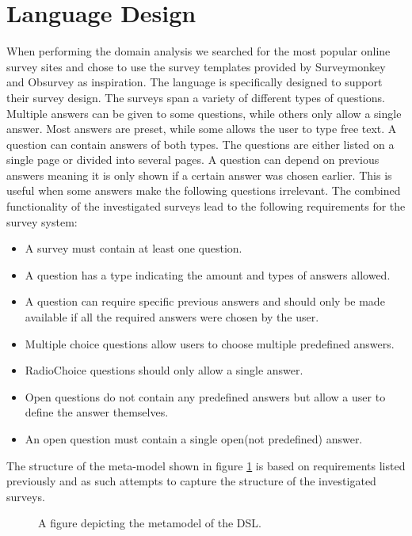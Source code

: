 \documentclass[runningheads]{llncs}
\begin{document}
\section{Language Design}
When performing the domain analysis we searched for the most popular online survey sites and chose to use the survey templates provided by Surveymonkey\cite{surveymonkey} and Obsurvey\cite{obsurvey} as inspiration. The language is specifically designed to support their survey design. The surveys span a variety of different types of questions. Multiple answers can be given to some questions, while others only allow a single answer. Most answers are preset, while some allows the user to type free text. A question can contain answers of both types. The questions are either listed on a single page or divided into several pages. A question can depend on previous answers meaning it is only shown if a certain answer was chosen earlier. This is useful when some answers make the following questions irrelevant. The combined functionality of the investigated surveys lead to the following requirements for the survey system:
\begin{itemize}
\item  A survey must contain at least one question. 
\item A question has a type indicating the amount and types of answers allowed. 
\item A question can require specific previous answers and should only be made available if all the required answers were chosen by the user. 
\item Multiple choice questions allow users to choose multiple predefined answers.
\item RadioChoice questions should only allow a single answer. 
\item Open questions do not contain any predefined answers but allow a user to define the answer themselves. 
\item An open question must contain a single open(not predefined) answer.
\end{itemize}
The structure of the meta-model shown in figure \ref{fig:mmod} is based on requirements listed previously and as such attempts to capture the structure of the investigated surveys. 
\begin{figure}
\centering
\caption{A figure depicting the metamodel of the DSL.}
\label{fig:mmod}
\end{figure}
\end{document}
